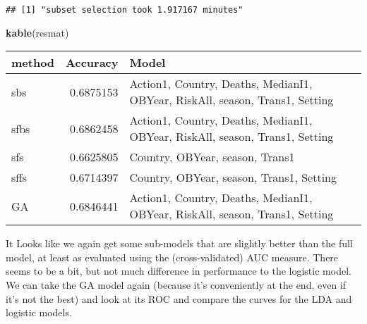 \documentclass[]{article}
\newenvironment{Shaded}{\begin{snugshade}}{\end{snugshade}}
\newcommand{\CommentTok}[1]{\textcolor[rgb]{0.56,0.35,0.01}{\textit{#1}}}
\newcommand{\DataTypeTok}[1]{\textcolor[rgb]{0.13,0.29,0.53}{#1}}
\newcommand{\DecValTok}[1]{\textcolor[rgb]{0.00,0.00,0.81}{#1}}
\newcommand{\KeywordTok}[1]{\textcolor[rgb]{0.13,0.29,0.53}{\textbf{#1}}}
\newcommand{\NormalTok}[1]{#1}
\newcommand{\OperatorTok}[1]{\textcolor[rgb]{0.81,0.36,0.00}{\textbf{#1}}}
\newcommand{\StringTok}[1]{\textcolor[rgb]{0.31,0.60,0.02}{#1}}
\begin{document}
\begin{verbatim}
## [1] "subset selection took 1.917167 minutes"
\end{verbatim}

\begin{Shaded}
\begin{Highlighting}[]
\KeywordTok{kable}\NormalTok{(resmat)}
\end{Highlighting}
\end{Shaded}

\begin{longtable}[]{@{}lrl@{}}
\toprule
method & Accuracy & Model\tabularnewline
\midrule
\endhead
sbs & 0.6875153 & Action1, Country, Deaths, MedianI1, OBYear, RiskAll,
season, Trans1, Setting\tabularnewline
sfbs & 0.6862458 & Action1, Country, Deaths, MedianI1, OBYear, RiskAll,
season, Trans1, Setting\tabularnewline
sfs & 0.6625805 & Country, OBYear, season, Trans1\tabularnewline
sffs & 0.6714397 & Country, OBYear, season, Trans1,
Setting\tabularnewline
GA & 0.6846441 & Action1, Country, Deaths, MedianI1, OBYear, RiskAll,
season, Trans1, Setting\tabularnewline
\bottomrule
\end{longtable}

It Looks like we again get some sub-models that are slightly better than
the full model, at least as evaluated using the (cross-validated) AUC
measure. There seems to be a bit, but not much difference in performance
to the logistic model. We can take the GA model again (because it's
conveniently at the end, even if it's not the best) and look at its ROC
and compare the curves for the LDA and logistic models.

\begin{Shaded}
\end{Shaded}
\end{document}
